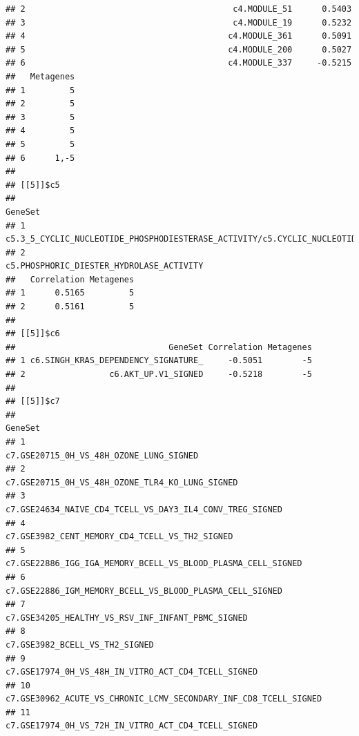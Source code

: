 \documentclass{article}\usepackage[]{graphicx}\usepackage[]{color}
\makeatletter
\newenvironment{kframe}{%
 \def\at@end@of@kframe{}%
 \ifinner\ifhmode%
  \def\at@end@of@kframe{\end{minipage}}%
  \begin{minipage}{\columnwidth}%
 \fi\fi%
 \def\FrameCommand##1{\hskip\@totalleftmargin \hskip-\fboxsep
 \colorbox{shadecolor}{##1}\hskip-\fboxsep
     \hskip-\linewidth \hskip-\@totalleftmargin \hskip\columnwidth}%
 \MakeFramed {\advance\hsize-\width
   \@totalleftmargin\z@ \linewidth\hsize
   \@setminipage}}%
 {\par\unskip\endMakeFramed%
 \at@end@of@kframe}
\newenvironment{knitrout}{}{} %
\makeatother
\begin{document}
\begin{knitrout}
\begin{kframe}
\begin{verbatim}
## 2                                          c4.MODULE_51      0.5403
## 3                                          c4.MODULE_19      0.5232
## 4                                         c4.MODULE_361      0.5091
## 5                                         c4.MODULE_200      0.5027
## 6                                         c4.MODULE_337     -0.5215
##   Metagenes
## 1         5
## 2         5
## 3         5
## 4         5
## 5         5
## 6      1,-5
## 
## [[5]]$c5
##                                                                                               GeneSet
## 1 c5.3_5_CYCLIC_NUCLEOTIDE_PHOSPHODIESTERASE_ACTIVITY/c5.CYCLIC_NUCLEOTIDE_PHOSPHODIESTERASE_ACTIVITY
## 2                                                            c5.PHOSPHORIC_DIESTER_HYDROLASE_ACTIVITY
##   Correlation Metagenes
## 1      0.5165         5
## 2      0.5161         5
## 
## [[5]]$c6
##                               GeneSet Correlation Metagenes
## 1 c6.SINGH_KRAS_DEPENDENCY_SIGNATURE_     -0.5051        -5
## 2                 c6.AKT_UP.V1_SIGNED     -0.5218        -5
## 
## [[5]]$c7
##                                                                                                                          GeneSet
## 1                                                                                        c7.GSE20715_0H_VS_48H_OZONE_LUNG_SIGNED
## 2                                                                                c7.GSE20715_0H_VS_48H_OZONE_TLR4_KO_LUNG_SIGNED
## 3                                                                       c7.GSE24634_NAIVE_CD4_TCELL_VS_DAY3_IL4_CONV_TREG_SIGNED
## 4                                                                                 c7.GSE3982_CENT_MEMORY_CD4_TCELL_VS_TH2_SIGNED
## 5                                                                   c7.GSE22886_IGG_IGA_MEMORY_BCELL_VS_BLOOD_PLASMA_CELL_SIGNED
## 6                                                                       c7.GSE22886_IGM_MEMORY_BCELL_VS_BLOOD_PLASMA_CELL_SIGNED
## 7                                                                              c7.GSE34205_HEALTHY_VS_RSV_INF_INFANT_PBMC_SIGNED
## 8                                                                                                 c7.GSE3982_BCELL_VS_TH2_SIGNED
## 9                                                                            c7.GSE17974_0H_VS_48H_IN_VITRO_ACT_CD4_TCELL_SIGNED
## 10                                                              c7.GSE30962_ACUTE_VS_CHRONIC_LCMV_SECONDARY_INF_CD8_TCELL_SIGNED
## 11                                                                           c7.GSE17974_0H_VS_72H_IN_VITRO_ACT_CD4_TCELL_SIGNED

\end{verbatim}
\end{kframe}
\end{knitrout}
\end{document}

